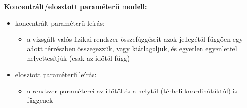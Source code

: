 \noindent \textbf{Koncentrált/elosztott paraméterű modell:}
\begin{itemize}
    \item koncentrált paraméterű leírás:
          \begin{itemize}
              \item a vizsgált valós fizikai rendszer összefüggéseit azok jellegétől függően egy adott térrészben összegezzük, vagy kiátlagoljuk, és egyetlen egyenlettel helyettesítjük (csak az időtől függ)
          \end{itemize}
    \item elosztott paraméterű leírás:
          \begin{itemize}
              \item a rendszer paraméterei az időtől és a helytől (térbeli koordinátáktól) is függenek
          \end{itemize}
\end{itemize}
